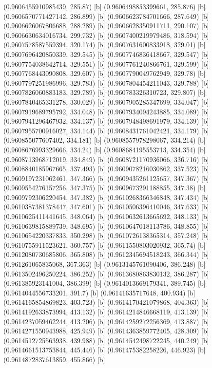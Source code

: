 {{{(0.9606455910985439, 285.87) [b] 
(0.9606498853399661, 285.876) [b] 
(0.9606570771427142, 286.899) [b] 
(0.9606623784701666, 287.649) [b] 
(0.9606626067806688, 288.289) [b] 
(0.9606628350911711, 290.107) [b] 
(0.9606630634016734, 299.732) [b] 
(0.9607400219979486, 318.594) [b] 
(0.9607578587559394, 320.174) [b] 
(0.9607631600833918, 329.01) [b] 
(0.9607696420850339, 329.545) [b] 
(0.9607746836418667, 329.547) [b] 
(0.9607754038642714, 329.551) [b] 
(0.9607761240866761, 329.599) [b] 
(0.9607768443090808, 329.607) [b] 
(0.9607790049762949, 329.78) [b] 
(0.9607797251986996, 329.783) [b] 
(0.9607804454211043, 329.788) [b] 
(0.9607826060883183, 329.789) [b] 
(0.960783326310723, 329.807) [b] 
(0.9607840465331278, 330.029) [b] 
(0.9607905285347699, 334.047) [b] 
(0.9607919689795792, 334.048) [b] 
(0.9607934094243885, 334.089) [b] 
(0.9607941296467932, 334.137) [b] 
(0.9607948498691979, 334.139) [b] 
(0.9607955700916027, 334.144) [b] 
(0.9608431761042421, 334.179) [b] 
(0.960855077607402, 334.181) [b] 
(0.9608557978298067, 334.214) [b] 
(0.9608676993329666, 334.24) [b] 
(0.9608684195553713, 334.354) [b] 
(0.9608713968712019, 334.849) [b] 
(0.9608721170936066, 336.716) [b] 
(0.9608840185967665, 337.493) [b] 
(0.9609078216030862, 337.523) [b] 
(0.9609197231062461, 347.366) [b] 
(0.9609435261125657, 347.367) [b] 
(0.9609554276157256, 347.375) [b] 
(0.9609673291188855, 347.38) [b] 
(0.9609792306220454, 347.382) [b] 
(0.9610268366346848, 347.434) [b] 
(0.9610387381378447, 347.601) [b] 
(0.9610506396410046, 347.633) [b] 
(0.9610625411441645, 348.064) [b] 
(0.9610632613665692, 348.133) [b] 
(0.9610639815889739, 348.695) [b] 
(0.9610647018113786, 348.855) [b] 
(0.9610654220337833, 350.298) [b] 
(0.9610726138365314, 357.248) [b] 
(0.9610755911523621, 360.757) [b] 
(0.9611550803020932, 365.74) [b] 
(0.9612080730685806, 365.808) [b] 
(0.9612345694518243, 366.344) [b] 
(0.961261065835068, 367.363) [b] 
(0.9613145761090406, 386.248) [b] 
(0.9613502496250224, 386.252) [b] 
(0.9613680863830132, 386.287) [b] 
(0.961385923141004, 386.399) [b] 
(0.9614013669179341, 389.745) [b] 
(0.9614044556733201, 391.7) [b] 
(0.96141635717648, 400.934) [b] 
(0.9614165854869823, 403.723) [b] 
(0.9614170421079868, 404.363) [b] 
(0.9614192633873994, 413.132) [b] 
(0.9614214846668119, 413.139) [b] 
(0.9614237059462244, 413.206) [b] 
(0.9614259272256369, 413.887) [b] 
(0.9614271550943988, 425.949) [b] 
(0.9614363859772405, 428.309) [b] 
(0.9614512725563938, 439.988) [b] 
(0.9614542498722245, 440.249) [b] 
(0.9614661513753844, 445.446) [b] 
(0.961475382258226, 446.923) [b] 
(0.9614872837613859, 455.866) [b] 
}}}
